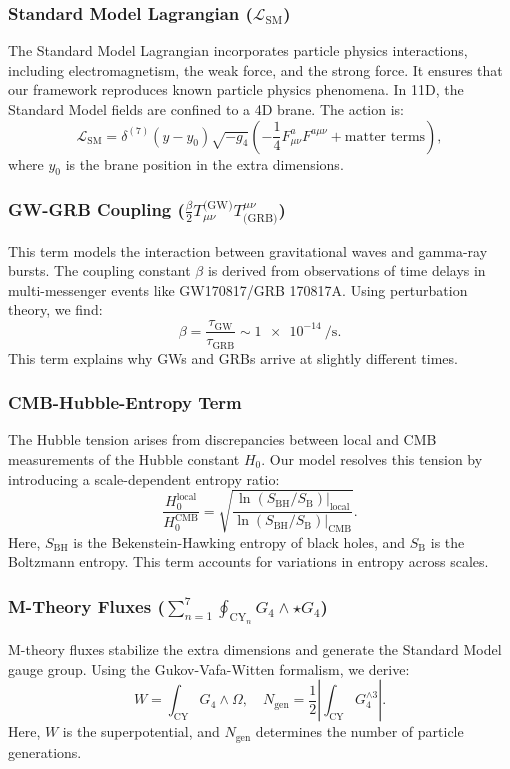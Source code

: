 \documentclass[12pt, a4paper]{article}
\begin{document}
\subsubsection{Standard Model Lagrangian ($\mathcal{L}_{\text{SM}}$)}
The Standard Model Lagrangian incorporates particle physics interactions, including electromagnetism, the weak force, and the strong force. It ensures that our framework reproduces known particle physics phenomena. In 11D, the Standard Model fields are confined to a 4D brane. The action is: \\
\[
\mathcal{L}_{\text{SM}} = \delta^{(7)}(y - y_0) \sqrt{-g_4} \left( -\frac{1}{4} F_{\mu\nu}^a F^{a\mu\nu} + \text{matter terms} \right),
\]
where \(y_0\) is the brane position in the extra dimensions.

\subsubsection{GW-GRB Coupling ($\frac{\beta}{2} T_{\mu\nu}^{\text{(GW)}} T^{\mu\nu}_{\text{(GRB)}}$)}
This term models the interaction between gravitational waves and gamma-ray bursts. The coupling constant \(\beta\) is derived from observations of time delays in multi-messenger events like GW170817/GRB 170817A. Using perturbation theory, we find:
\[
\beta = \frac{\tau_{\text{GW}}}{\tau_{\text{GRB}}} \sim \SI{1e-14}{\per\second}.
\]
This term explains why GWs and GRBs arrive at slightly different times.

\subsubsection{CMB-Hubble-Entropy Term}
The Hubble tension arises from discrepancies between local and CMB measurements of the Hubble constant \(H_0\). Our model resolves this tension by introducing a scale-dependent entropy ratio:
\[
\frac{H_0^{\text{local}}}{H_0^{\text{CMB}}} = \sqrt{\frac{\ln(S_{\text{BH}}/S_{\text{B}})|_{\text{local}}}{\ln(S_{\text{BH}}/S_{\text{B}})|_{\text{CMB}}}}.
\]
Here, \(S_{\text{BH}}\) is the Bekenstein-Hawking entropy of black holes, and \(S_{\text{B}}\) is the Boltzmann entropy. This term accounts for variations in entropy across scales.

\subsubsection{M-Theory Fluxes ($\sum_{n=1}^7 \oint_{\text{CY}_n} G_4 \wedge \star G_4$)}
M-theory fluxes stabilize the extra dimensions and generate the Standard Model gauge group. Using the Gukov-Vafa-Witten formalism, we derive:
\[
W = \int_{\text{CY}} G_4 \wedge \Omega,\quad N_{\text{gen}} = \frac{1}{2} \left| \int_{\text{CY}} G_4^{\wedge 3} \right|.
\]
Here, \(W\) is the superpotential, and \(N_{\text{gen}}\) determines the number of particle generations.
\end{document}
